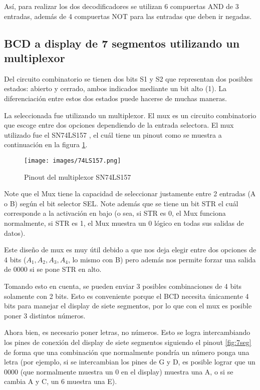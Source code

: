 \documentclass[conference]{IEEEtran}  %
\begin{document}
Así, para realizar los dos decodificadores se utilizan 6 compuertas AND de 3 entradas, además de 4 compuertas NOT para las entradas que deben ir negadas.

\subsection{BCD a display de 7 segmentos utilizando un multiplexor}

Del circuito combinatorio se tienen dos bits S1 y S2 que representan dos posibles estados: abierto y cerrado, ambos indicados mediante un bit alto (1). La diferenciación entre estos dos estados puede hacerse de muchas maneras.

La seleccionada fue utilizando un multiplexor. El mux es un circuito combinatorio que escoge entre dos opciones dependiendo de la entrada selectora. El mux utilizado fue el SN74LS157 \cite{Sandorobotics_74LS157} , el cuál tiene un pinout como se muestra a continuación en la figura \ref{fig:74LS157}.

\begin{figure}[h!] %
    \centering    
    \texttt{[image: images/74LS157.png]} %
    \caption{Pinout del multiplexor SN74LS157 \cite{Sandorobotics_74LS157}}
    \label{fig:74LS157}
\end{figure}


Note que el Mux tiene la capacidad de seleccionar justamente entre 2 entradas (A o B) según el bit selector SEL. Note además que se tiene un bit STR el cuál corresponde a la activación en bajo (o sea, si STR es 0, el Mux funciona normalmente, si STR es 1, el Mux muestra un 0 lógico en todas sus salidas de datos).

Este diseño de mux es muy útil debido a que nos deja elegir entre dos opciones de 4 bits ($A_1,A_2,A_3,A_4$, lo mismo con B) pero además nos permite forzar una salida de $0000$ si se pone STR en alto.

Tomando esto en cuenta, se pueden enviar 3 posibles combinaciones de 4 bits solamente con 2 bits. Esto es conveniente porque el BCD necesita únicamente 4 bits para manejar el display de siete segmentos, por lo que con el mux es posible poner 3 distintos números. 

Ahora bien, es necesario poner letras, no números. Esto se logra intercambiando los pines de conexión del display de siete segmentos \cite{XLITX_5621BS} siguiendo el pinout \ref{fig:7seg} de forma que una combinación que normalmente pondría un número ponga una letra (por ejemplo, si se intercambian los pines de G y D, es posible lograr que un 0000 (que normalmente muestra un 0 en el display) muestra una A, o si se cambia A y C, un 6 muestra una E).
\end{document}
